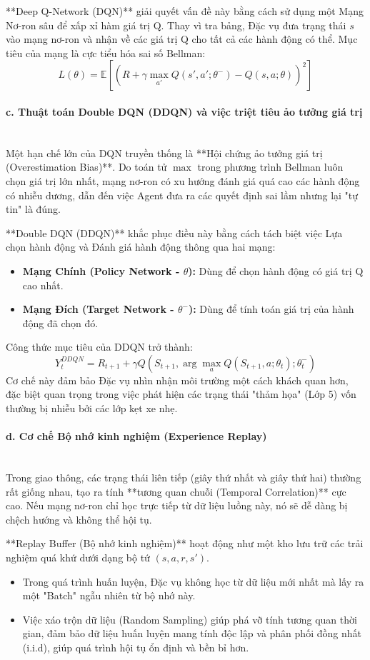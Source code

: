 **Deep Q-Network (DQN)** giải quyết vấn đề này bằng cách sử dụng một Mạng Nơ-ron sâu để xấp xỉ hàm giá trị Q. Thay vì tra bảng, Đặc vụ đưa trạng thái $s$ vào mạng nơ-ron và nhận về các giá trị Q cho tất cả các hành động có thể. Mục tiêu của mạng là cực tiểu hóa sai số Bellman:
$$L(\theta) = \mathbb{E} \left[ \left( R + \gamma \max_{a'} Q(s', a'; \theta^-) - Q(s, a; \theta) \right)^2 \right]$$

\paragraph{c. Thuật toán Double DQN (DDQN) và việc triệt tiêu ảo tưởng giá trị} \mbox{} \\
Một hạn chế lớn của DQN truyền thống là **Hội chứng ảo tưởng giá trị (Overestimation Bias)**. Do toán tử $\max$ trong phương trình Bellman luôn chọn giá trị lớn nhất, mạng nơ-ron có xu hướng đánh giá quá cao các hành động có nhiễu dương, dẫn đến việc Agent đưa ra các quyết định sai lầm nhưng lại "tự tin" là đúng.

**Double DQN (DDQN)** khắc phục điều này bằng cách tách biệt việc Lựa chọn hành động và Đánh giá hành động thông qua hai mạng:
\begin{itemize}
    \item \textbf{Mạng Chính (Policy Network - $\theta$):} Dùng để chọn hành động có giá trị Q cao nhất.
    \item \textbf{Mạng Đích (Target Network - $\theta^-$):} Dùng để tính toán giá trị của hành động đã chọn đó.
\end{itemize}
Công thức mục tiêu của DDQN trở thành:
$$Y_t^{DDQN} = R_{t+1} + \gamma Q(S_{t+1}, \arg\max_{a} Q(S_{t+1}, a; \theta_t); \theta^-_t)$$
Cơ chế này đảm bảo Đặc vụ nhìn nhận môi trường một cách khách quan hơn, đặc biệt quan trọng trong việc phát hiện các trạng thái "thảm họa" (Lớp 5) vốn thường bị nhiễu bởi các lớp kẹt xe nhẹ.

\paragraph{d. Cơ chế Bộ nhớ kinh nghiệm (Experience Replay)} \mbox{} \\
Trong giao thông, các trạng thái liên tiếp (giây thứ nhất và giây thứ hai) thường rất giống nhau, tạo ra tính **tương quan chuỗi (Temporal Correlation)** cực cao. Nếu mạng nơ-ron chỉ học trực tiếp từ dữ liệu luồng này, nó sẽ dễ dàng bị chệch hướng và không thể hội tụ.

**Replay Buffer (Bộ nhớ kinh nghiệm)** hoạt động như một kho lưu trữ các trải nghiệm quá khứ dưới dạng bộ tứ $(s, a, r, s')$.
\begin{itemize}
    \item Trong quá trình huấn luyện, Đặc vụ không học từ dữ liệu mới nhất mà lấy ra một "Batch" ngẫu nhiên từ bộ nhớ này.
    \item Việc xáo trộn dữ liệu (Random Sampling) giúp phá vỡ tính tương quan thời gian, đảm bảo dữ liệu huấn luyện mang tính độc lập và phân phối đồng nhất (i.i.d), giúp quá trình hội tụ ổn định và bền bỉ hơn.
\end{itemize}


